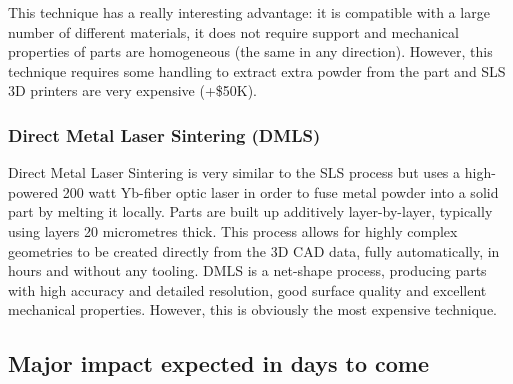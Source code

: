 \begin{figure}[h]
    \centering
        \hfil
        \hfil
    \caption{}
    \label{fig:SLS_technique}
\end{figure}

This technique has a really interesting advantage: it is compatible with a large number of different materials, it does not require support and mechanical properties of parts are homogeneous (the same in any direction). However, this technique requires some handling to extract extra powder from the part and SLS 3D printers are very expensive (+\$50K).


\subsubsection{Direct Metal Laser Sintering (DMLS)} %

Direct Metal Laser Sintering is very similar to the SLS process but uses a high-powered 200 watt Yb-fiber optic laser in order to fuse metal powder into a solid part by melting it locally. Parts are built up additively layer-by-layer, typically using layers 20 micrometres thick. This process allows for highly complex geometries to be created directly from the 3D CAD data, fully automatically, in hours and without any tooling. DMLS is a net-shape process, producing parts with high accuracy and detailed resolution, good surface quality and excellent mechanical properties. However, this is obviously the most expensive technique.

\begin{figure}[h]
    \centering
        \hfil
        \hfil
    \caption{}
    \label{fig:DMLS_technique}
\end{figure}


\subsection{Major impact expected in days to come} %

